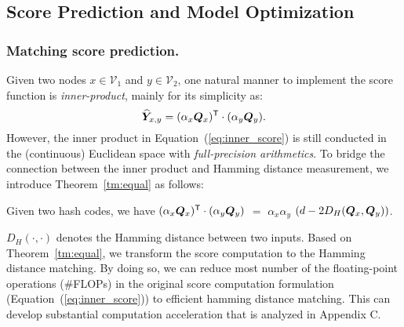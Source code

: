 \subsection{Score Prediction and Model Optimization}
\label{sec:score}


\subsubsection{\textbf{Matching score prediction.}}
\label{sec:score_computation}
Given two nodes $x \in \mathcal{V}_1$ and $y \in \mathcal{V}_2$, one natural manner to implement the score function is \textit{inner-product}, mainly for its simplicity as:
\begin{equation}
\setlength\abovedisplayskip{2pt}
\setlength\belowdisplayskip{2pt}
\label{eq:inner_score}
\widehat{\emb{Y}}_{x,y} =  (\alpha_x\emb{Q}_x)^\mathsf{T} \cdot (\alpha_y\emb{Q}_y).
\end{equation}
However, the inner product in Equation~(\ref{eq:inner_score}) is still conducted in the (continuous) Euclidean space with \textit{full-precision arithmetics}.
To bridge the connection between the inner product and Hamming distance measurement, we introduce Theorem~\ref{tm:equal} as follows:

\begin{thm}
\label{tm:equal}
Given two hash codes, we have $(\alpha_x\boldsymbol{Q}_x)^\mathsf{T} \cdot (\alpha_y\boldsymbol{Q}_y)$ $=$ $\alpha_x\alpha_y$ $(d - 2D_{H}(\boldsymbol{Q}_x, \boldsymbol{Q}_y))$.
\end{thm}

$D_H(\cdot, \cdot)$ denotes the Hamming distance between two inputs.
Based on Theorem~\ref{tm:equal}, we transform the score computation to the Hamming distance matching. 
By doing so, we can reduce most number of the floating-point operations (\#FLOPs) in the original score computation formulation (Equation~(\ref{eq:inner_score})) to efficient hamming distance matching.
This can develop substantial computation acceleration that is analyzed in Appendix C.



